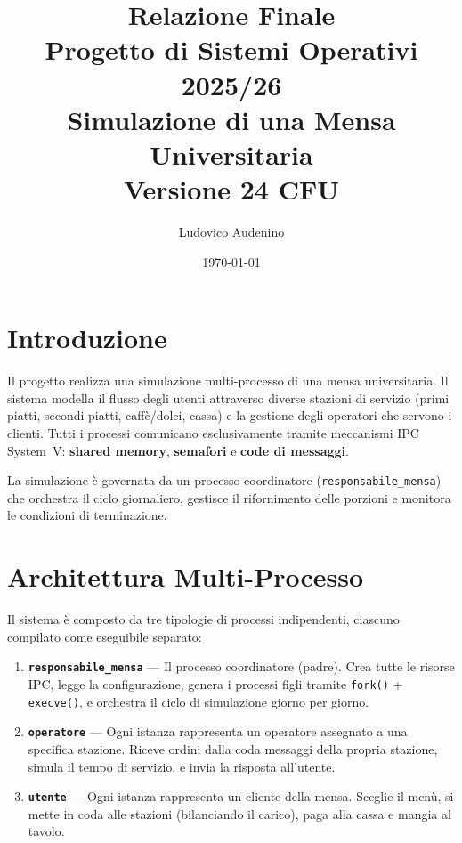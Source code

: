 \documentclass[a4paper,12pt]{article}
\title{%
  \textbf{Relazione Finale}\\[0.3em]
  \large Progetto di Sistemi Operativi 2025/26\\
  Simulazione di una Mensa Universitaria\\[0.5em]
  \normalsize Versione 24 CFU
}
\author{Ludovico Audenino}
\date{\today}
\begin{document}
\maketitle
\tableofcontents
\newpage

\section{Introduzione}

Il progetto realizza una simulazione multi-processo di una mensa universitaria.
Il sistema modella il flusso degli utenti attraverso diverse stazioni di
servizio (primi piatti, secondi piatti, caffè/dolci, cassa) e la gestione
degli operatori che servono i clienti. Tutti i processi comunicano
esclusivamente tramite meccanismi IPC System~V: \textbf{shared memory},
\textbf{semafori} e \textbf{code di messaggi}.

La simulazione è governata da un processo coordinatore
(\texttt{responsabile\_mensa}) che orchestra il ciclo giornaliero,
gestisce il rifornimento delle porzioni e monitora le condizioni
di terminazione.

\section{Architettura Multi-Processo}

Il sistema è composto da tre tipologie di processi indipendenti,
ciascuno compilato come eseguibile separato:

\begin{enumerate}
  \item \textbf{\texttt{responsabile\_mensa}} --- Il processo coordinatore
        (padre). Crea tutte le risorse IPC, legge la configurazione,
        genera i processi figli tramite \texttt{fork()} + \texttt{execve()},
        e orchestra il ciclo di simulazione giorno per giorno.

  \item \textbf{\texttt{operatore}} --- Ogni istanza rappresenta un
        operatore assegnato a una specifica stazione. Riceve ordini
        dalla coda messaggi della propria stazione, simula il tempo
        di servizio, e invia la risposta all'utente.

  \item \textbf{\texttt{utente}} --- Ogni istanza rappresenta un
        cliente della mensa. Sceglie il menù, si mette in coda
        alle stazioni (bilanciando il carico), paga alla cassa e
        mangia al tavolo.
\end{enumerate}
\end{document}
